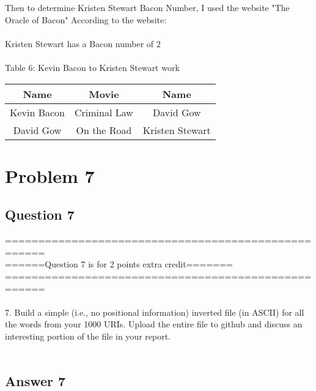\documentclass[10pt,letterpaper]{article}
\begin{document}
Then to determine Kristen Stewart Bacon Number, I used the website "The Oracle of Bacon"  According to the website:\\
\\
Kristen Stewart has a Bacon number of 2\\
\\
Table 6: Kevin Bacon to Kristen Stewart work
\begin{center}
  \begin{tabular}{ | c | c | c }
    \hline
      Name & Movie & Name\\ \hline
      Kevin Bacon & Criminal Law & David Gow\\ \hline 
      David Gow & On the Road & Kristen Stewart\\ \hline       
    \hline
  \end{tabular}
\end{center}


\pagebreak
\section{Problem 7}
\subsection{Question 7}
====================================================\\
======Question 7 is for 2 points extra credit=======\\
====================================================\\
\\
7.  Build a simple (i.e., no positional information) inverted file
(in ASCII) for all the words from your 1000 URIs.  Upload the entire
file to github and discuss an interesting portion of the file in
your report.\\
\\
\subsection{Answer 7}

\pagebreak
\end{document}
